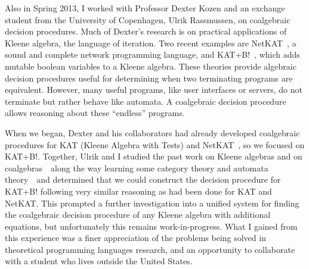 \documentclass[12pt]{article}
\newcommand{\hdr}[2]{\vspace{-0.4cm}{\flushleft{\hrulefill\\\textbf{#1}\hfill{#2}\\\vspace{-0.2cm}\hrulefill}}\vspace{0.1cm}}
\begin{document}

\hdr{Kleene Coalgebras}{Spring 2014}

Also in Spring 2013, I worked with Professor Dexter Kozen and an exchange student from the University of Copenhagen, Ulrik Rassmussen, on coalgebraic decision procedures.
Much of Dexter's research is on practical applications of Kleene algebra, the language of iteration.
Two recent examples are NetKAT~\cite{anderson2014netkat}, a sound and complete network programming language, and KAT+B!~\cite{GKM14a}, which adds mutable boolean variables to a Kleene algebra.
These theories provide algebraic decision procedures useful for determining when two terminating programs are equivalent.
However, many useful programs, like user interfaces or servers, do not terminate but rather behave like automata.
A coalgebraic decision procedure allows reasoning about these ``endless'' programs.

When we began, Dexter and his collaborators had already developed coalgebraic procedures for KAT (Kleene Algebra with Tests) and NetKAT~\cite{foster2014coalgebraic}, so we focused on KAT+B!.
Together, Ulrik and I studied the past work on Kleene algebras and on coalgebras~\textemdash~along the way learning some category theory and automata theory~\textemdash~and determined that we could construct the decision procedure for KAT+B! following very similar reasoning as had been done for KAT and NetKAT.
This prompted a further investigation into a unified system for finding the coalgebraic decision procedure of any Kleene algebra with additional equations, but unfortunately this remains work-in-progress.
What I gained from this experience was a finer appreciation of the problems being solved in theoretical programming languages research, and an opportunity to collaborate with a student who lives outside the United States.

\vfill
\renewcommand{\section}[2]{}
\begin{multicols}{2}
\footnotesize


\end{multicols}
\end{document}
